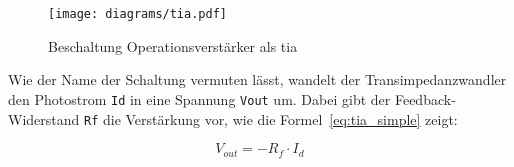 \begin{figure}[H]
    \centering
    \texttt{[image: diagrams/tia.pdf]}
    \caption{Beschaltung Operationsverstärker als \acrshort{tia}}\label{fig:theory_tia}
\end{figure}

Wie der Name der Schaltung vermuten lässt, wandelt der Transimpedanzwandler den Photostrom \lstinline|Id| in eine Spannung
\lstinline|Vout| um. Dabei gibt der Feedback-Widerstand \lstinline|Rf| die Verstärkung vor, wie die Formel~\ref{eq:tia_simple}
zeigt:

\begin{equation}\label{eq:tia_simple}
    V_{out} = -R_{f} \cdot I_{d}
\end{equation}
